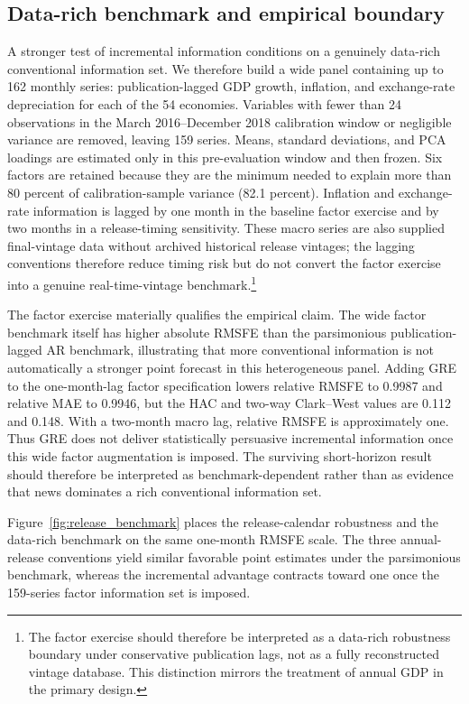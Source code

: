\documentclass[preprint,12pt,authoryear]{elsarticle}
\begin{document}
\subsection{Data-rich benchmark and empirical boundary}
A stronger test of incremental information conditions on a genuinely data-rich conventional information set. We therefore build a wide panel containing up to 162 monthly series: publication-lagged GDP growth, inflation, and exchange-rate depreciation for each of the 54 economies. Variables with fewer than 24 observations in the March 2016--December 2018 calibration window or negligible variance are removed, leaving 159 series. Means, standard deviations, and PCA loadings are estimated only in this pre-evaluation window and then frozen. Six factors are retained because they are the minimum needed to explain more than 80 percent of calibration-sample variance (82.1 percent). Inflation and exchange-rate information is lagged by one month in the baseline factor exercise and by two months in a release-timing sensitivity. These macro series are also supplied final-vintage data without archived historical release vintages; the lagging conventions therefore reduce timing risk but do not convert the factor exercise into a genuine real-time-vintage benchmark.\footnote{The factor exercise should therefore be interpreted as a data-rich robustness boundary under conservative publication lags, not as a fully reconstructed vintage database. This distinction mirrors the treatment of annual GDP in the primary design.}



The factor exercise materially qualifies the empirical claim. The wide factor benchmark itself has higher absolute RMSFE than the parsimonious publication-lagged AR benchmark, illustrating that more conventional information is not automatically a stronger point forecast in this heterogeneous panel. Adding GRE to the one-month-lag factor specification lowers relative RMSFE to 0.9987 and relative MAE to 0.9946, but the HAC and two-way Clark--West values are 0.112 and 0.148. With a two-month macro lag, relative RMSFE is approximately one. Thus GRE does not deliver statistically persuasive incremental information once this wide factor augmentation is imposed. The surviving short-horizon result should therefore be interpreted as benchmark-dependent rather than as evidence that news dominates a rich conventional information set.

Figure~\ref{fig:release_benchmark} places the release-calendar robustness and the data-rich benchmark on the same one-month RMSFE scale. The three annual-release conventions yield similar favorable point estimates under the parsimonious benchmark, whereas the incremental advantage contracts toward one once the 159-series factor information set is imposed.
\end{document}
